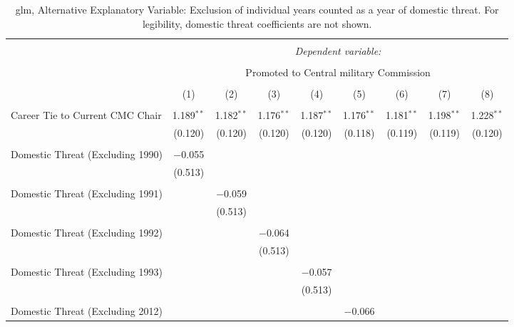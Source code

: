 \documentclass[12pt,letterpaper]{article}
\begin{document}
\begin{table}[!htbp] \centering 
	\caption{glm, Alternative Explanatory Variable: Exclusion of individual years counted as a year of domestic threat. For legibility, domestic threat coefficients are not shown.} 
	\label{} 
	\rmfamily
	\scriptsize 
	\begin{tabular}{@{\extracolsep{5pt}}lcccccccc} 
		\\[-1.8ex]\hline 
		\hline \\[-1.8ex] 
		& \multicolumn{8}{c}{\textit{Dependent variable:}} \\ 
		\cline{2-9} 
		\\[-1.8ex] & \multicolumn{8}{c}{Promoted to Central military Commission} \\ 
		\\[-1.8ex] & (1) & (2) & (3) & (4) & (5) & (6) & (7) & (8)\\ 
		\hline \\[-1.8ex] 
		Career Tie to Current CMC Chair & 1.189$^{**}$ & 1.182$^{**}$ & 1.176$^{**}$ & 1.187$^{**}$ & 1.176$^{**}$ & 1.181$^{**}$ & 1.198$^{**}$ & 1.228$^{**}$ \\ 
		& (0.120) & (0.120) & (0.120) & (0.120) & (0.118) & (0.119) & (0.119) & (0.120) \\ 
		& & & & & & & & \\ 
		Domestic Threat (Excluding 1990) & $-$0.055 &  &  &  &  &  &  &  \\ 
		& (0.513) &  &  &  &  &  &  &  \\ 
		& & & & & & & & \\ 
		Domestic Threat (Excluding 1991) &  & $-$0.059 &  &  &  &  &  &  \\ 
		&  & (0.513) &  &  &  &  &  &  \\ 
		& & & & & & & & \\ 
		Domestic Threat (Excluding 1992) &  &  & $-$0.064 &  &  &  &  &  \\ 
		&  &  & (0.513) &  &  &  &  &  \\ 
		& & & & & & & & \\ 
		Domestic Threat (Excluding 1993) &  &  &  & $-$0.057 &  &  &  &  \\ 
		&  &  &  & (0.513) &  &  &  &  \\ 
		& & & & & & & & \\ 
		Domestic Threat (Excluding 2012) &  &  &  &  & $-$0.066 &  &  &  \\ 

\end{tabular}
\end{table}
\end{document}
